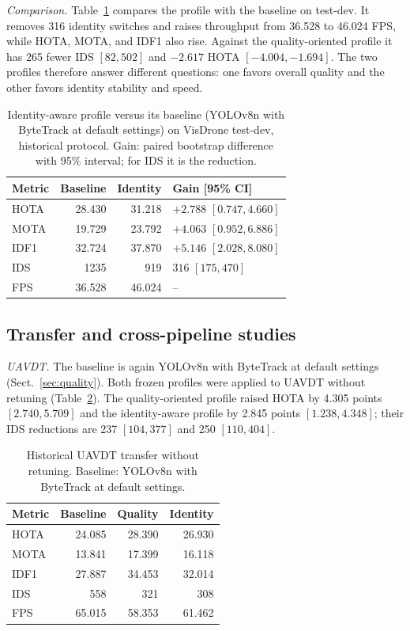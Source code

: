 \documentclass[pdflatex,sn-mathphys-num,iicol]{sn-jnl}
\begin{document}
\emph{Comparison.} Table~\ref{tab:identity} compares the profile with the
baseline on test-dev. It removes 316 identity switches and raises throughput
from 36.528 to 46.024 FPS, while HOTA, MOTA, and IDF1 also rise. Against the
quality-oriented profile it has 265 fewer IDS $[82, 502]$ and $-2.617$ HOTA
$[-4.004, -1.694]$. The two profiles therefore answer different questions: one
favors overall quality and the other favors identity stability and speed.

\begin{table}[t]
\caption{Identity-aware profile versus its baseline (YOLOv8n with ByteTrack at
default settings) on VisDrone test-dev, historical protocol. Gain: paired
bootstrap difference with 95\% interval; for IDS it is the reduction.}
\label{tab:identity}
\centering\footnotesize
\setlength{\tabcolsep}{4pt}
\begin{tabular}{@{}lrrl@{}}
\toprule
Metric & Baseline & Identity & Gain [95\% CI]\\
\midrule
HOTA & 28.430 & 31.218 & $+2.788$ $[0.747, 4.660]$\\
MOTA & 19.729 & 23.792 & $+4.063$ $[0.952, 6.886]$\\
IDF1 & 32.724 & 37.870 & $+5.146$ $[2.028, 8.080]$\\
IDS & 1235 & 919 & $316$ $[175, 470]$\\
FPS & 36.528 & 46.024 & --\\
\bottomrule
\end{tabular}
\end{table}

\subsection{Transfer and cross-pipeline studies}\label{sec:transfer}

\emph{UAVDT.} The baseline is again YOLOv8n with ByteTrack at default settings
(Sect.~\ref{sec:quality}). Both frozen profiles were applied to UAVDT
\cite{du2018uavdt} without retuning (Table~\ref{tab:hist-uavdt}). The
quality-oriented profile raised HOTA by 4.305 points $[2.740, 5.709]$ and the
identity-aware profile by 2.845 points $[1.238, 4.348]$; their IDS reductions
are 237 $[104, 377]$ and 250 $[110, 404]$.

\begin{table}[t]
\caption{Historical UAVDT transfer without retuning. Baseline: YOLOv8n with
ByteTrack at default settings.}
\label{tab:hist-uavdt}
\centering\footnotesize
\setlength{\tabcolsep}{4pt}
\begin{tabular}{@{}lrrr@{}}
\toprule
Metric & Baseline & Quality & Identity\\
\midrule
HOTA & 24.085 & 28.390 & 26.930\\
MOTA & 13.841 & 17.399 & 16.118\\
IDF1 & 27.887 & 34.453 & 32.014\\
IDS & 558 & 321 & 308\\
FPS & 65.015 & 58.353 & 61.462\\
\bottomrule
\end{tabular}
\end{table}
\end{document}
